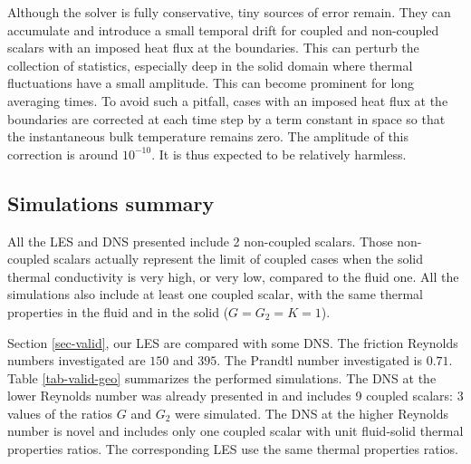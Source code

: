 \documentclass{svjour3}                     %
\begin{document}
Although the solver is fully conservative, tiny sources of error remain.
They can accumulate and introduce a small temporal drift for coupled and non-coupled scalars with an imposed heat flux at the boundaries.
This can perturb the collection of statistics, especially deep in the solid domain where thermal fluctuations have a small amplitude.
This can become prominent for long averaging times.
To avoid such a pitfall, cases with an imposed heat flux at the boundaries are corrected at each time step by a term constant in space so that the instantaneous bulk temperature remains zero.
The amplitude of this correction is around $10^{-10}$.
It is thus expected to be relatively harmless.

\subsection{Simulations summary}
\label{subsec-simu-done}

All the LES and DNS presented include 2 non-coupled scalars.
Those non-coupled scalars actually represent the limit of coupled cases when the solid thermal conductivity is very high, or very low, compared to the fluid one.
All the simulations also include at least one coupled scalar, with the same thermal properties in the fluid and in the solid (${G=G_2=K=1}$).

Section \ref{sec-valid}, our LES are compared with some DNS.
The friction Reynolds numbers investigated are $150$ and $395$.
The Prandtl number investigated is $0.71$.
Table \ref{tab-valid-geo} summarizes the performed simulations.
The DNS at the lower Reynolds number was already presented in \cite{flageul2017discontinuity} and includes 9 coupled scalars: 3 values of the ratios $G$ and $G_2$ were simulated.
The DNS at the higher Reynolds number is novel and includes only one coupled scalar with unit fluid-solid thermal properties ratios.
The corresponding LES use the same thermal properties ratios.
\end{document}

